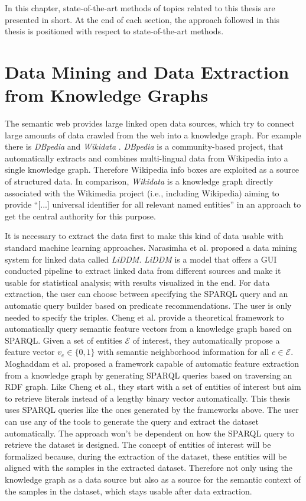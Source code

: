In this chapter, state-of-the-art methods of topics related to this thesis are presented in short. At the end of each section, the approach followed in this thesis is positioned with respect to state-of-the-art methods.

\section{Data Mining and Data Extraction from Knowledge Graphs}
The semantic web provides large linked open data sources, which try to connect large amounts of data crawled from the web into a knowledge graph. For example there is \emph{DBpedia} \cite{mendes2012dbpedia} and \emph{Wikidata} \cite{van2019wikidata}. \emph{DBpedia} is a community-based project, that automatically extracts and combines multi-lingual data from Wikipedia into a single knowledge graph. Therefore Wikipedia info boxes are exploited as a source of structured data. In comparison, \emph{Wikidata} is a knowledge graph directly associated with the Wikimedia project (i.e., including Wikipedia) aiming to provide ``[...] universal identifier for all relevant named entities''\cite{van2019wikidata} in an approach to get the central authority for this purpose.

It is necessary to extract the data first to make this kind of data usable with standard machine learning approaches. Narasimha et al. \cite{narasimha2011liddm} proposed a data mining system for linked data called \emph{LiDDM}. \emph{LiDDM} is a model that offers a GUI conducted pipeline to extract linked data from different sources and make it usable for statistical analysis; with results visualized in the end. For data extraction, the user can choose between specifying the SPARQL query and an automatic query builder based on predicate recommendations. The user is only needed to specify the triples.
Cheng et al. \cite{cheng2011automated} provide a theoretical framework to automatically query semantic feature vectors from a knowledge graph based on SPARQL. Given a set of entities $\mathcal{E}$ of interest, they automatically propose a feature vector $v_e \in \{0,1\}$ with semantic neighborhood information for all $e \in \mathcal{E}$.
Moghaddam et al. \cite{moghaddam2021literal2feature} proposed a framework capable of automatic feature extraction from a knowledge graph by generating SPARQL queries based on traversing an RDF graph. Like Cheng et al., they start with a set of entities of interest but aim to retrieve literals instead of a lengthy binary vector automatically.
This thesis uses SPARQL queries like the ones generated by the frameworks above. The user can use any of the tools to generate the query and extract the dataset automatically. The approach won't be dependent on how the SPARQL query to retrieve the dataset is designed. The concept of entities of interest will be formalized because, during the extraction of the dataset, these entities will be aligned with the samples in the extracted dataset. Therefore not only using the knowledge graph as a data source but also as a source for the semantic context of the samples in the dataset, which stays usable after data extraction.

